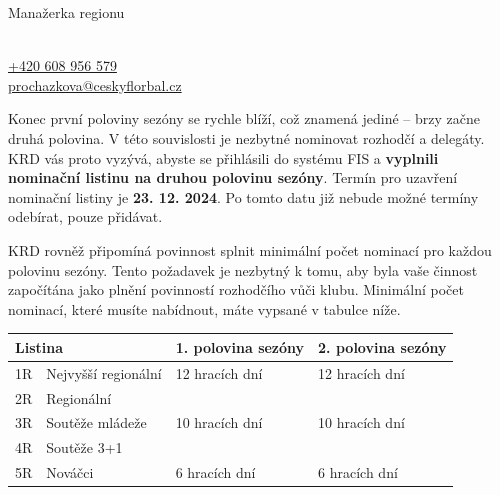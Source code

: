 \documentclass{newsletter}
\begin{document}
\begin{admonition-info}{Manažerka regionu}
	\begin{flushleft}
		\hspace{0.5em} %
		\parbox{8cm}{ %
			\textcolor{cfblue}{{\large {}}}
			\\
			{\small \href{tel:608956579}{+420 608 956 579}}\\
			{\small \href{mailto:prochazkova@ceskyflorbal.cz}{prochazkova@ceskyflorbal.cz}}
		}
	\end{flushleft}
\end{admonition-info}

Konec první poloviny sezóny se rychle blíží, což znamená jediné – brzy začne druhá polovina. V této souvislosti je nezbytné nominovat rozhodčí a delegáty. KRD vás proto vyzývá, abyste se přihlásili do systému FIS a \textcolor{cfred}{\textbf{vyplnili nominační listinu na druhou polovinu sezóny}}. Termín pro uzavření nominační listiny je \textbf{23. 12. 2024}. Po tomto datu již nebude možné termíny odebírat, pouze přidávat.

KRD rovněž připomíná povinnost splnit minimální počet nominací pro každou polovinu sezóny. Tento požadavek je nezbytný k tomu, aby byla vaše činnost započítána jako plnění povinností rozhodčího vůči klubu. Minimální počet nominací, které musíte nabídnout, máte vypsané v tabulce níže.

\begin{table}[h]
	\centering
	\renewcommand{\arraystretch}{2}
	\begin{tabularx}{\textwidth}{| r | l | X | X |}
		\hline
		\multicolumn{2}{|l|}{\textbf{Listina}} & \textbf{1. polovina sezóny}  & \textbf{2. polovina sezóny} \\
		\hline
		1R & Nejvyšší regionální & 12 hracích dní & 12 hracích dní \\
		\hline
		2R & Regionální & \multirow{3}{*}{10 hracích dní} & \multirow{3}{*}{10 hracích dní} \\
		\cline{1-2}
		3R & Soutěže mládeže & & \\
		\cline{1-2}
		4R & Soutěže 3+1 & & \\
		\hline
		5R & Nováčci & 6 hracích dní & 6 hracích dní\\
		\hline
	\end{tabularx}
\end{table}
\end{document}
